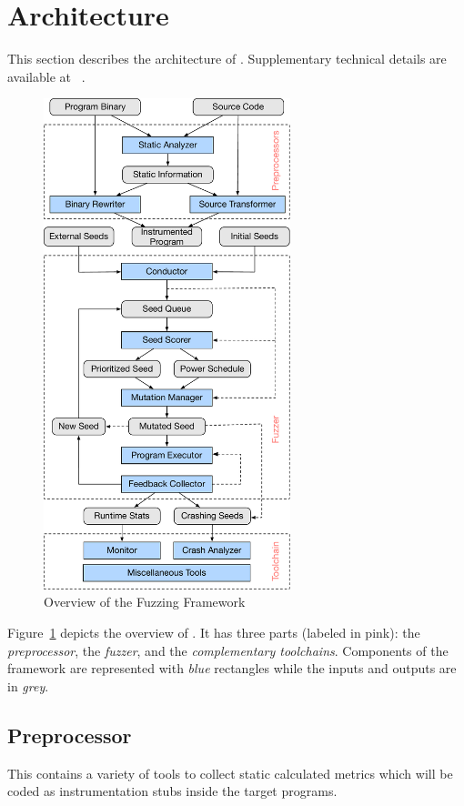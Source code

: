 \section{Architecture}\label{sec:details}

This section describes the architecture of {\FOT}. Supplementary technical details {\FOT} are available at ~\cite{fot-webpage}.


\begin{figure}[t]
	\centering
	\includegraphics[width=0.64\textwidth]{res/fot/FOT_overview}
	\caption{Overview of the {\FOT} Fuzzing Framework}
	\label{fig:fot_workflow}
\end{figure}

Figure~\ref{fig:fot_workflow} depicts the overview of {\FOT}.
It has three parts (labeled in pink): the \emph{preprocessor}, the \emph{fuzzer}, and the \emph{complementary toolchains}.
Components of the framework are represented with \emph{blue} rectangles while the inputs and outputs are in \emph{grey}.


\subsection{Preprocessor}
This contains a variety of tools to collect static calculated metrics which will be coded as instrumentation stubs inside the target programs.


